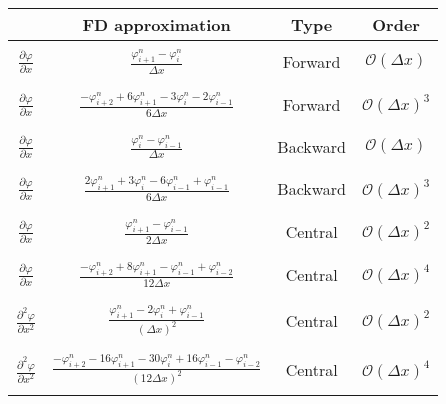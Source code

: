 \documentclass[12pts,a4paper,amsmath,amssymb,floatfix]{article}%
\renewcommand\phi{\varphi}
\newcommand{\frc}{\displaystyle\frac}
\begin{document}
\begin{center}
\begin{longtable}{|| c | c | c | c ||} 
\hline\hline
            & {\bf FD approximation}  & {\bf Type}  & {\bf Order} \\
\hline\hline
& & & \\
$\frc{\partial\phi}{\partial x}$ & $\frc{\phi_{i+1}^{n}-\phi_{i}^{n}}{\Delta x}$ & Forward & $\mathcal{O}\left(\Delta x\right)$  \\ 
& & & \\
\hline
& & & \\
$\frc{\partial\phi}{\partial x}$ & $\frc{-\phi_{i+2}^{n}+6\phi_{i+1}^{n}-3\phi_{i}^{n}-2\phi_{i-1}^{n}}{6\Delta x}$ & Forward & $\mathcal{O}\left(\Delta x\right)^{3}$   \\   
& & & \\
\hline

& & & \\
$\frc{\partial\phi}{\partial x}$ & $\frc{\phi_{i}^{n}-\phi_{i-1}^{n}}{\Delta x}$ & Backward & $\mathcal{O}\left(\Delta x\right)$  \\ 
& & & \\
\hline
& & & \\
$\frc{\partial\phi}{\partial x}$ & $\frc{2\phi_{i+1}^{n}+3\phi_{i}^{n}-6\phi_{i-1}^{n}+\phi_{i-1}^{n}}{6\Delta x}$ & Backward & $\mathcal{O}\left(\Delta x\right)^3$  \\ 
& & & \\
\hline


& & & \\
$\frc{\partial\phi}{\partial x}$ & $\frc{\phi_{i+1}^{n}-\phi_{i-1}^{n}}{2\Delta x}$ & Central & $\mathcal{O}\left(\Delta x\right)^{2}$  \\ 
& & & \\
\hline
& & & \\
$\frc{\partial\phi}{\partial x}$ & $\frc{-\phi_{i+2}^{n}+8\phi_{i+1}^{n}-\phi_{i-1}^{n}+\phi_{i-2}^{n}}{12\Delta x}$ & Central & $\mathcal{O}\left(\Delta x\right)^{4}$  \\ 
& & & \\
\hline


& & & \\
$\frc{\partial^{2}\phi}{\partial x^{2}}$ & $\frc{\phi_{i+1}^{n}-2\phi_{i}^{n}+\phi_{i-1}^{n}}{\left(\Delta x\right)^{2}}$ & Central & $\mathcal{O}\left(\Delta x\right)^{2}$  \\ 
& & & \\
\hline
& & & \\
$\frc{\partial^{2}\phi}{\partial x^{2}}$ & $\frc{-\phi_{i+2}^{n}-16\phi_{i+1}^{n}-30\phi_{i}^{n}+16\phi_{i-1}^{n}-\phi_{i-2}^{n}}{\left(12\Delta x\right)^{2}}$ & Central & $\mathcal{O}\left(\Delta x\right)^{4}$  \\ 
& & & \\
\hline


\end{longtable}
\end{center}
\end{document}
